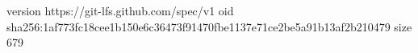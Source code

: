 version https://git-lfs.github.com/spec/v1
oid sha256:1af773fc18cee1b150e6c36473f91470fbe1137e71ce2be5a91b13af2b210479
size 679
